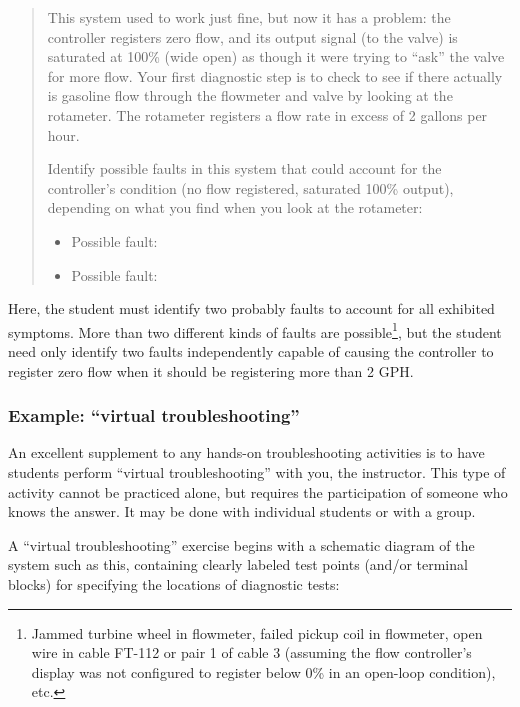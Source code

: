 \begin{quotation}

This system used to work just fine, but now it has a problem: the controller registers zero flow, and its output signal (to the valve) is saturated at 100\% (wide open) as though it were trying to ``ask'' the valve for more flow.  Your first diagnostic step is to check to see if there actually is gasoline flow through the flowmeter and valve by looking at the rotameter.  The rotameter registers a flow rate in excess of 2 gallons per hour.

Identify possible faults in this system that could account for the controller's condition (no flow registered, saturated 100\% output), depending on what you find when you look at the rotameter:

\vskip 10pt

\begin{itemize}
\item Possible fault:
\item Possible fault:
\end{itemize}

\end{quotation}

Here, the student must identify two probably faults to account for all exhibited symptoms.  More than two different kinds of faults are possible\footnote{Jammed turbine wheel in flowmeter, failed pickup coil in flowmeter, open wire in cable FT-112 or pair 1 of cable 3 (assuming the flow controller's display was not configured to register below 0\% in an open-loop condition), etc.}, but the student need only identify two faults independently capable of causing the controller to register zero flow when it should be registering more than 2 GPH. 





\filbreak
\subsubsection{Example: ``virtual troubleshooting''}

An excellent supplement to any hands-on troubleshooting activities is to have students perform ``virtual troubleshooting'' with you, the instructor.  This type of activity cannot be practiced alone, but requires the participation of someone who knows the answer.  It may be done with individual students or with a group.

\vskip 10pt

A ``virtual troubleshooting'' exercise begins with a schematic diagram of the system such as this, containing clearly labeled test points (and/or terminal blocks) for specifying the locations of diagnostic tests:


